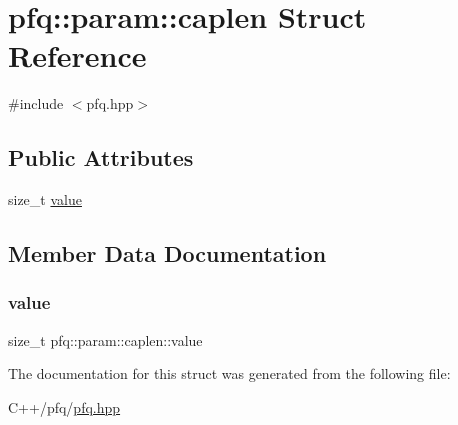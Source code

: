 \hypertarget{structpfq_1_1param_1_1caplen}{}\section{pfq\+:\+:param\+:\+:caplen Struct Reference}
\label{structpfq_1_1param_1_1caplen}


{\ttfamily \#include $<$pfq.\+hpp$>$}

\subsection*{Public Attributes}
\begin{DoxyCompactItemize}
\item 
size\+\_\+t \hyperlink{structpfq_1_1param_1_1caplen_ad706d73fbbd8342fea36e920253aaa02}{value}
\end{DoxyCompactItemize}


\subsection{Member Data Documentation}
\mbox{\label{structpfq_1_1param_1_1caplen_ad706d73fbbd8342fea36e920253aaa02}} 
\subsubsection{\texorpdfstring{value}{value}}
{\footnotesize\ttfamily size\+\_\+t pfq\+::param\+::caplen\+::value}



The documentation for this struct was generated from the following file\+:\begin{DoxyCompactItemize}
\item 
C++/pfq/\hyperlink{pfq_8hpp}{pfq.\+hpp}\end{DoxyCompactItemize}
